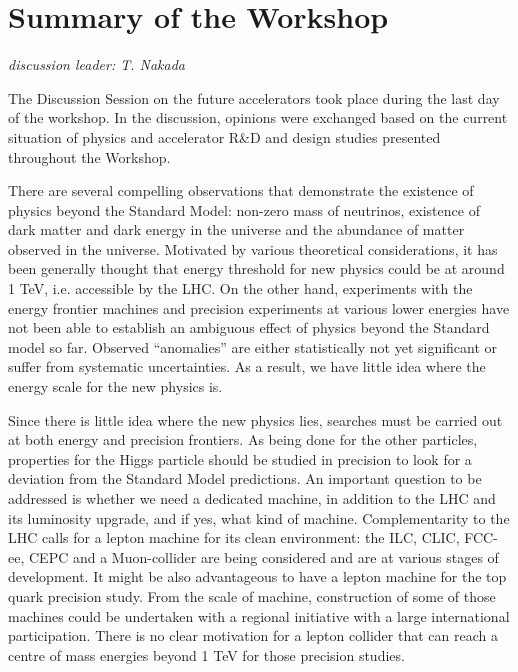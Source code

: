 \section{Summary of the Workshop}\label{summary}
{\it discussion leader: T. Nakada}

\noindent The Discussion Session on the future accelerators took place during the last day of the workshop. In the discussion, opinions were exchanged based on the current situation of physics and accelerator R\&D and design studies presented throughout the Workshop.
\medskip

\noindent There are several compelling observations that demonstrate the existence of physics beyond the Standard Model: non-zero mass of neutrinos, existence of dark matter and dark energy in the universe and the abundance of matter observed in the universe. Motivated by various theoretical considerations, it has been generally thought that energy threshold for new physics could be at around 1 TeV, i.e. accessible by the LHC. On the other hand, experiments with the energy frontier machines and precision experiments at various lower energies have not been able to establish an ambiguous effect of physics beyond the Standard model so far. Observed “anomalies” are either statistically not yet significant or suffer from systematic uncertainties. As a result, we have little idea where the energy scale for the new physics is. 
\medskip

\noindent Since there is little idea where the new physics lies, searches must be carried out at both energy and precision frontiers. As being done for the other particles, properties for the Higgs particle should be studied in precision to look for a deviation from the Standard Model predictions. An important question to be addressed is whether we need a dedicated machine, in addition to the LHC and its luminosity upgrade, and if yes, what kind of machine. Complementarity to the LHC calls for a lepton machine for its clean environment: the ILC, CLIC, FCC-ee, CEPC and a Muon-collider are being considered and are  at various stages of development. It might be also advantageous to have a lepton machine for the top quark precision study. From the scale of machine, construction of some of those machines could be undertaken with a regional initiative with a large international participation. There is no clear motivation for a lepton collider that can reach a  centre of mass energies beyond 1 TeV for those precision studies.
\medskip

